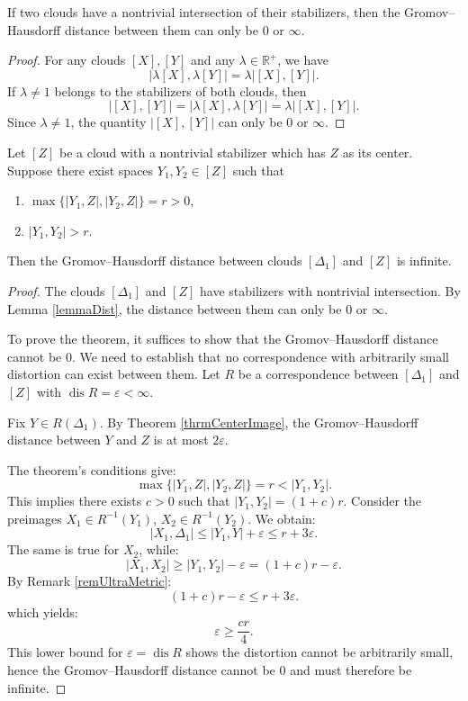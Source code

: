 \begin{lemma}\label{lemmaDist}
  If two clouds have a nontrivial intersection of their stabilizers,
  then the Gromov--Hausdorff distance between them can only be $0$
  or $\infty$.
\end{lemma}

\begin{proof}
  For any clouds $[X], [Y]$ and any $\lambda \in \mathbb{R}^{+}$, we have
  $$
  \big|\lambda[X], \lambda[Y]\big| = \lambda\big|[X], [Y]\big|.
  $$
  If $\lambda \neq 1$ belongs to the stabilizers of both clouds, then
  $$
  \big|[X],[Y]\big| = \big|\lambda[X], \lambda[Y]\big| =
  \lambda\big|[X], [Y]\big|.
  $$
  Since $\lambda \neq 1$, the quantity $\big|[X],[Y]\big|$ can only
  be $0$ or $\infty$.
\end{proof}

\begin{theorem}\label{thrmDist}
  Let $[Z]$ be a cloud with a nontrivial stabilizer which has $Z$ as
  its center. Suppose there exist spaces $Y_{1}, Y_{2} \in [Z]$ such that
  \begin{enumerate}
    \item $\max\{ |Y_{1},Z|, |Y_{2}, Z| \} = r > 0$,
    \item $|Y_{1}, Y_{2}| > r$.
  \end{enumerate}
  Then the Gromov--Hausdorff distance between clouds $[\Delta_1]$ and
  $[Z]$ is infinite.
\end{theorem}

\begin{proof}
  The clouds $[\Delta_1]$ and $[Z]$ have stabilizers with nontrivial
  intersection. By Lemma \ref{lemmaDist}, the distance between them
  can only be $0$ or $\infty$.

  To prove the theorem, it suffices to show that the
  Gromov--Hausdorff distance cannot be $0$. We need to establish that
  no correspondence with arbitrarily small distortion can exist
  between them. Let $R$ be a correspondence between $[\Delta_1]$ and
  $[Z]$ with $\operatorname{dis} R = \varepsilon < \infty$.

  Fix $Y \in R(\Delta_1)$. By Theorem \ref{thrmCenterImage}, the
  Gromov--Hausdorff distance between $Y$ and $Z$ is at most $2\varepsilon$.

  The theorem's conditions give:
  $$
  \max\{ |Y_{1},Z|, |Y_{2}, Z| \} = r < |Y_{1}, Y_{2}|.
  $$
  This implies there exists $c > 0$ such that $|Y_{1},Y_{2}| = (1 +
  c)r$. Consider the preimages $X_1 \in R^{-1}(Y_{1})$, $X_2 \in
  R^{-1}(Y_{2})$. We obtain:
  $$
  |X_1, \Delta_1| \leq |Y_{1}, Y| + \varepsilon \leq r + 3\varepsilon.
  $$
  The same is true for $X_2$, while:
  $$
  |X_1, X_2| \geq |Y_{1}, Y_{2}| - \varepsilon = (1+c)r - \varepsilon.
  $$
  By Remark \ref{remUltraMetric}:
  $$
  (1+c)r - \varepsilon \leq r + 3\varepsilon.
  $$
  which yields:
  $$
  \varepsilon \geq \frac{cr}{4}.
  $$
  This lower bound for $\varepsilon = \operatorname{dis} R$ shows the
  distortion cannot be arbitrarily small, hence the Gromov--Hausdorff
  distance cannot be $0$ and must therefore be infinite.
\end{proof}

